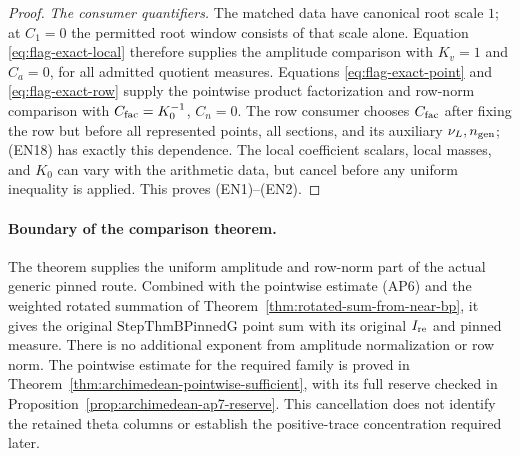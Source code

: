 \begin{proof}
\emph{The consumer quantifiers.}
The matched data have canonical root scale \(1\);
at \(C_1=0\) the permitted root window consists of
that scale alone. Equation \eqref{eq:flag-exact-local}
therefore supplies the amplitude comparison with
\(K_v=1\) and \(C_a=0\), for all admitted quotient
measures. Equations \eqref{eq:flag-exact-point} and
\eqref{eq:flag-exact-row} supply the pointwise product
factorization and row-norm comparison with
\(C_{\rm fac}=K_0^{-1}\), \(C_n=0\).
The row consumer chooses \(C_{\rm fac}\) after fixing
the row but before all represented points, all
sections, and its auxiliary \(\nu_L,n_{\rm gen}\);
(EN18) has exactly this dependence. The local
coefficient scalars, local masses, and \(K_0\) can
vary with the arithmetic data, but cancel before
any uniform inequality is applied. This proves
(EN1)--(EN2).
\end{proof}

\paragraph{Boundary of the comparison theorem.}
The theorem supplies the uniform amplitude and
row-norm part of the actual generic pinned route.
Combined with the pointwise estimate (AP6) and the
weighted rotated summation of
Theorem~\ref{thm:rotated-sum-from-near-bp}, it gives the
original \(\mathrm{StepThmBPinnedG}\) point sum with its
original \(I_{\rm re}\) and pinned measure. There is no
additional exponent from amplitude normalization or
row norm. The pointwise estimate for the required family is
proved in Theorem~\ref{thm:archimedean-pointwise-sufficient},
with its full reserve checked in
Proposition~\ref{prop:archimedean-ap7-reserve}.
This cancellation does not identify the retained
theta columns or establish the positive-trace
concentration required later.
